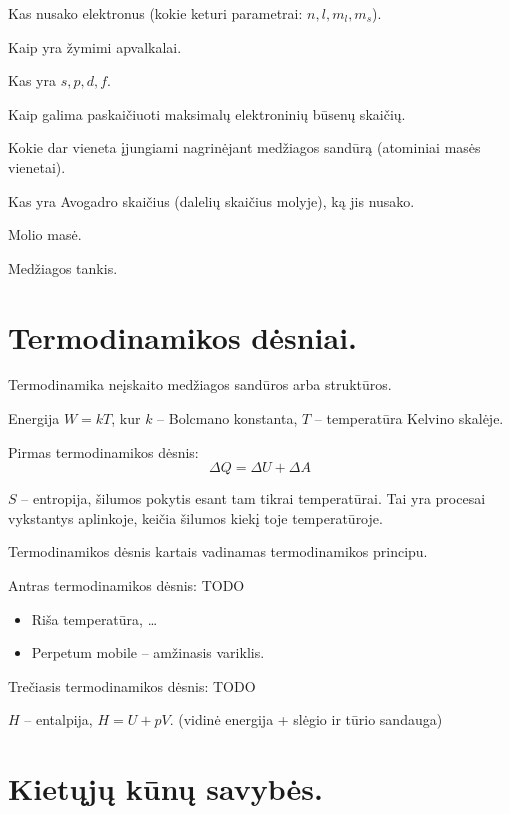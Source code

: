 \begin{remember}
  \item Kas nusako elektronus (kokie keturi parametrai: $n, l, m_{l},
    m_{s}$).
  \item Kaip yra žymimi apvalkalai.
  \item Kas yra $s, p, d, f$.
  \item Kaip galima paskaičiuoti maksimalų elektroninių būsenų skaičių.
  \item Kokie dar vieneta įjungiami nagrinėjant medžiagos sandūrą
    (atominiai masės vienetai).
  \item Kas yra Avogadro skaičius (dalelių skaičius molyje), ką jis nusako.
  \item Molio masė.
  \item Medžiagos tankis.
\end{remember}

\section{Termodinamikos dėsniai.}

Termodinamika neįskaito medžiagos sandūros arba struktūros.

Energija $W = kT$, kur $k$ – Bolcmano konstanta, $T$ – temperatūra
Kelvino skalėje.

Pirmas termodinamikos dėsnis:
\begin{equation*}
  \Delta Q = \Delta U + \Delta A
\end{equation*}

$S$ – entropija, šilumos pokytis esant tam tikrai temperatūrai. Tai yra
procesai vykstantys aplinkoje, keičia šilumos kiekį toje temperatūroje.

Termodinamikos dėsnis kartais vadinamas termodinamikos principu.

Antras termodinamikos dėsnis: TODO


\begin{itemize}
  \item Riša temperatūra, …
  \item Perpetum mobile – amžinasis variklis.
\end{itemize}

Trečiasis termodinamikos dėsnis: TODO

$H$ – entalpija, $H = U + pV$. (vidinė energija + slėgio ir tūrio sandauga)

\section{Kietųjų kūnų savybės.}

